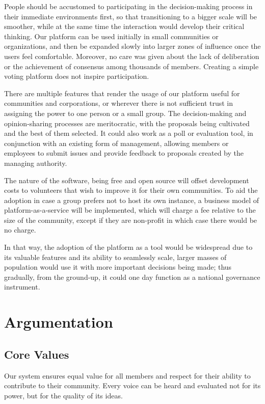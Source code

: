 \documentclass[a4paper,11pt]{article}
\begin{document}
\begin{multicols}{2}
People should be accustomed to participating in the decision-making process in their immediate environments first, so that transitioning to a bigger scale will be smoother, while at the same time the interaction would develop their critical thinking. Our platform can be used initially in small communities or organizations, and then be expanded slowly into larger zones of influence once the users feel comfortable. Moreover, no care was given about the lack of deliberation or the achievement of consensus among thousands of members. Creating a simple voting platform does not inspire participation.

There are multiple features that render the usage of our platform useful for communities and corporations, or wherever there is not sufficient trust in assigning the power to one person or a small group. The decision-making and opinion-sharing processes are meritocratic, with the proposals being cultivated and the best of them selected. It could also work as a poll or evaluation tool, in conjunction with an existing form of management, allowing members or employees to submit issues and provide feedback to proposals created by the managing authority.

The nature of the software, being free and open source will offset development costs to volunteers that wish to improve it for their own communities. To aid the adoption in case a group prefers not to host its own instance, a business model of platform-as-a-service will be implemented, which will charge a fee relative to the size of the community, except if they are non-profit in which case there would be no charge.

In that way, the adoption of the platform as a tool would be widespread due to its valuable features and its ability to seamlessly scale, larger masses of population would use it with more important decisions being made; thus gradually, from the ground-up, it could one day function as a national governance instrument.

\section{Argumentation} \label{argumentation}

\subsection{Core Values} \label{core}

Our system ensures equal value for all members and respect for their ability to contribute to their community. Every voice can be heard and evaluated not for its power, but for the quality of its ideas.


\end{multicols}
\end{document}
